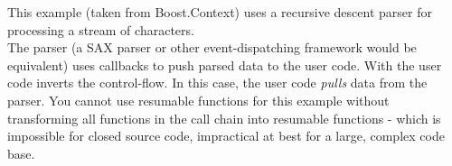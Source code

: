 \label{appendix}
This example (taken from Boost.Context\cite{bcontext}) uses a recursive descent
parser for processing a stream of characters.\\
The parser (a SAX parser or other event-dispatching framework would be
equivalent) uses callbacks to push parsed data to the user code. With \ectx the
user code inverts the control-flow. In this case, the user code \emph{pulls}
data from the parser.
You cannot use resumable functions for this example without transforming all
functions in the call chain into resumable functions - which is impossible for
closed source code, impractical at best for a large, complex code base.
